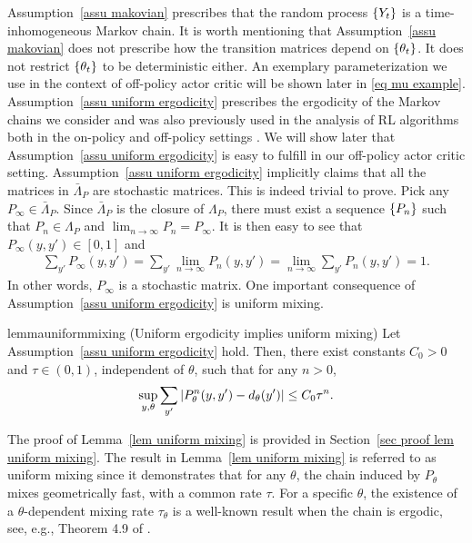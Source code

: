 \documentclass[twoside,11pt]{article}
\numberwithin{assucounter}{section}
\begin{document}
Assumption~\ref{assu makovian} prescribes that the random process $\qty{Y_t}$ is a time-inhomogeneous Markov chain.
It is worth mentioning that Assumption~\ref{assu makovian} does not prescribe how the transition matrices depend on $\qty{\theta_t}$.
It does not restrict $\qty{\theta_t}$ to be deterministic either.
An exemplary parameterization we use in the context of off-policy actor critic will be shown later in \eqref{eq mu example}.
Assumption~\ref{assu uniform ergodicity} prescribes the ergodicity of the Markov chains we consider and was also previously used in the analysis of RL algorithms both in the on-policy \citep{marbach2001simulation} and off-policy settings \citep{zhang2021breaking}.
We will show later that Assumption~\ref{assu uniform ergodicity} is easy to fulfill in our off-policy actor critic setting.
Assumption~\ref{assu uniform ergodicity} implicitly claims that all the matrices in $\bar \Lambda_P$ are stochastic matrices.
This is indeed trivial to prove.
Pick any $P_\infty \in \bar \Lambda_P$.
Since $\bar \Lambda_P$ is the closure of $\Lambda_P$,
there must exist a sequence $\qty{P_n}$ such that $P_n \in \Lambda_P$ and $\lim_{n\to\infty} P_n = P_\infty$.
It is then easy to see that $P_\infty(y, y') \in [0, 1]$ and 
\begin{align}
  \sum_{y'} P_\infty(y, y') = \sum_{y'} \lim_{n\to\infty} P_n(y, y') = \lim_{n\to\infty} \sum_{y'} P_n(y, y') = 1.
\end{align}
In other words, $P_\infty$ is a stochastic matrix.
One important consequence of Assumption~\ref{assu uniform ergodicity} is uniform mixing.
\begin{restatable}{lemma}{uniformmixing}
  \label{lem uniform mixing}
  (Uniform ergodicity implies uniform mixing)
Let Assumption~\ref{assu uniform ergodicity} hold. 
Then, there exist constants $C_0 > 0$ and $\tau \in (0, 1)$,
independent of $\theta$,
such that for any $n > 0$,
\begin{align}
    \label{eq uniform mixing}
    \sup_{y, \theta} \sum_{y'} \abs{P^n_\theta(y, y') -  d_\theta(y')} \leq C_0 \tau^n.
\end{align}
\end{restatable}
\noindent The proof of Lemma~\ref{lem uniform mixing} is provided in Section~\ref{sec proof lem uniform mixing}.
The result in Lemma~\ref{lem uniform mixing} is referred to as uniform mixing since it demonstrates that for any $\theta$,
the chain induced by $P_\theta$ mixes geometrically fast,
with a common rate $\tau$.
For a specific $\theta$,
the existence of a $\theta$-dependent mixing rate $\tau_\theta$ is a well-known result when the chain is ergodic, see, e.g., Theorem 4.9 of \citet{levin2017markov}.
\end{document}
